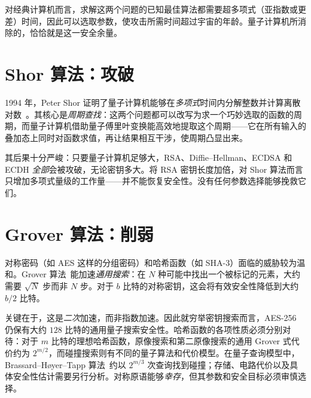 对经典计算机而言，求解这两个问题的已知最佳算法都需要超多项式（亚指数或更差）时间，因此可以选取参数，使攻击所需时间超过宇宙的年龄。量子计算机所消除的，恰恰就是这一安全余量。

\section{Shor 算法：攻破}

1994 年，Peter Shor 证明了量子计算机能够在\emph{多项式}时间内分解整数并计算离散对数~\cite{shor1997}。其核心是\emph{周期查找}：这两个问题都可以改写为求一个巧妙选取的函数的周期，而量子计算机借助量子傅里叶变换能高效地提取这个周期——它在所有输入的叠加态上同时对函数求值，再让结果相互干涉，使周期凸显出来。

其后果十分严峻：只要量子计算机足够大，RSA、Diffie--Hellman、ECDSA 和 ECDH \emph{全部}会被攻破，无论密钥多大。将 RSA 密钥长度加倍，对 Shor 算法而言只增加多项式量级的工作量——并不能恢复安全性。没有任何参数选择能够挽救它们。

\section{Grover 算法：削弱}

对称密码（如 AES 这样的分组密码）和哈希函数（如 SHA-3）面临的威胁较为温和。Grover 算法~\cite{grover1996}能加速\emph{通用搜索}：在 $N$ 种可能中找出一个被标记的元素，大约需要 $\sqrt{N}$ 步而非 $N$ 步。对于 $b$ 比特的对称密钥，这会将有效安全性降低到大约 $b/2$ 比特。

关键在于，这是\emph{二次}加速，而非指数加速。因此就穷举密钥搜索而言，AES-256 仍保有大约 $128$ 比特的通用量子搜索安全性。哈希函数的各项性质必须分别对待：对于 $m$ 比特的理想哈希函数，原像搜索和第二原像搜索的通用 Grover 式代价约为 $2^{m/2}$，而碰撞搜索则有不同的量子算法和代价模型。在量子查询模型中，Brassard--H\o yer--Tapp 算法~\cite{bht1997}约以 $2^{m/3}$ 次查询找到碰撞；存储、电路代价以及具体安全性估计需要另行分析。对称原语能够\emph{幸存}，但其参数和安全目标必须审慎选择。

